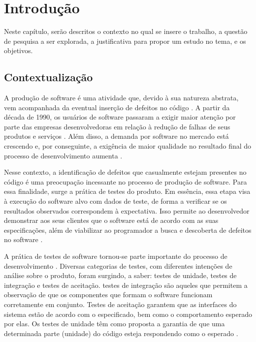 \chapter[Introdução]{Introdução}

Neste capítulo, serão descritos o contexto no qual se insere o trabalho, a
questão de pesquisa a ser explorada, a justificativa para propor um estudo no
tema, e os objetivos.

\section{Contextualização}
\indent A produção de software é uma atividade que, devido à sua natureza
abstrata, vem acompanhada da eventual inserção de defeitos no código
\cite{trodo2009}. A partir da década de 1990, os usuários de software
passaram a exigir maior atenção por parte das empresas desenvolvedoras em 
relação à redução de falhas de seus produtos e serviços
\cite{sommerville2007}. Além disso, a demanda por software no mercado está
crescendo \cite{philipson2004} e, por conseguinte, a exigência de maior
qualidade no resultado final do processo de desenvolvimento aumenta
\cite{barbosaEtAl2009}.
\par
\indent Nesse contexto, a identificação de defeitos que casualmente estejam
presentes no código é uma preocupação incessante no processo de produção de
software. Para essa finalidade, surge a prática de testes do produto. Em
essência, essa etapa visa à execução do software alvo com dados de teste, de
forma a verificar se os resultados observados correspondem à expectativa.
Isso permite ao desenvolvedor demonstrar aos seus clientes que o software
está de acordo com as suas especificações, além de viabilizar ao
programador a busca e descoberta de defeitos no software
\cite{sommerville2007}.
\par
\indent A prática de testes de software tornou-se parte importante do
processo de desenvolvimento \cite{barbosaEtAl2009}. Diversas categorias de
testes, com diferentes intenções de análise sobre o produto, foram surgindo,
a saber: testes de unidade, testes de integração e testes de aceitação.
testes de integração são aqueles que permitem a observação de que os
componentes que formam o software funcionam corretamente em conjunto. Testes
de aceitação garantem que as interfaces do sistema estão de acordo com o
especificado, bem como o comportamento esperado por elas. Os testes de
unidade têm como proposta a garantia  de que uma determinada parte (unidade)
do código esteja respondendo como o esperado \cite{sommerville2007}.
